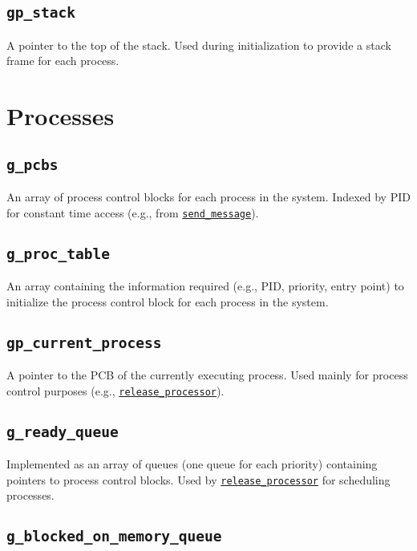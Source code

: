 \documentclass[12pt]{report}
\begin{document}
\subsection{\texttt{gp_stack}}

A pointer to the top of the stack. Used during initialization to provide a stack frame for each process.

\section{Processes}

\subsection{\texttt{g_pcbs}}

An array of process control blocks for each process in the system. Indexed by PID for constant time access (e.g., from \hyperref[alg:sendingmessages]{\texttt{send_message}}).

\subsection{\texttt{g_proc_table}}

An array containing the information required (e.g., PID, priority, entry point) to initialize the process control block for each process in the system.

\subsection{\texttt{gp_current_process}}

A pointer to the PCB of the currently executing process. Used mainly for process control purposes (e.g., \hyperref[alg:releasingtheprocessor]{\texttt{release_processor}}).

\subsection{\texttt{g_ready_queue}}

Implemented as an array of queues (one queue for each priority) containing pointers to process control blocks. Used by \hyperref[alg:releasingtheprocessor]{\texttt{release_processor}} for scheduling processes.

\subsection{\texttt{g_blocked_on_memory_queue}}
\end{document}
